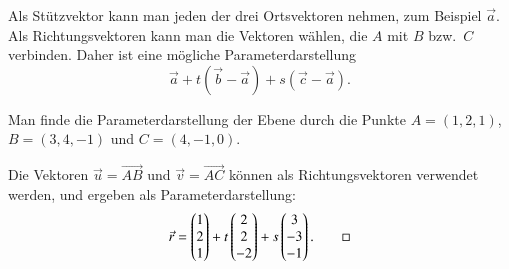 Als Stützvektor kann man jeden der drei Ortsvektoren nehmen, zum Beispiel
$\vec{a}$.
Als Richtungsvektoren kann man die Vektoren wählen, die $A$ mit $B$ bzw.~$C$
verbinden.
Daher ist eine mögliche Parameterdarstellung
\[
\vec{a} + t (\vec{b}-\vec{a}) + s(\vec{c}-\vec{a}).
\]

\begin{beispiel}
Man finde die Parameterdarstellung der Ebene durch die Punkte
$A=(1,2,1)$,
$B=(3,4,-1)$ und
$C=(4,-1,0)$.

\smallskip

{\parindent 0pt Die} Vektoren $\vec u=\overrightarrow{AB}$ und
$\vec v=\overrightarrow{AC}$ können als Richtungsvektoren
verwendet werden, und ergeben als Parameterdarstellung:
\begin{equation}
\vec r=\begin{pmatrix}1\\2\\1 \end{pmatrix}
+
t\begin{pmatrix}2\\2\\-2\end{pmatrix}
+
s\begin{pmatrix}3\\-3\\-1\end{pmatrix}.
\label{beispielebene}
\qedhere
\end{equation}
\end{beispiel}

